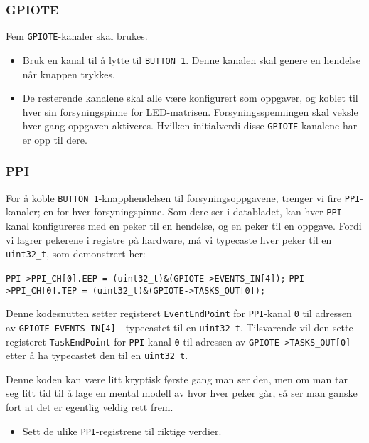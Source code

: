 \subsubsection{GPIOTE}

Fem \verb|GPIOTE|-kanaler skal brukes. 

\begin{itemize}
    \item Bruk en kanal til å lytte til \verb|BUTTON 1|. Denne kanalen skal genere en hendelse når knappen trykkes. 
    \item De resterende kanalene skal alle være konfigurert som oppgaver, og koblet til hver sin forsyningspinne for LED-matrisen. Forsyningsspenningen skal veksle hver gang oppgaven aktiveres. Hvilken initialverdi disse \verb|GPIOTE|-kanalene har er opp til dere.
\end{itemize}

\subsubsection{PPI}

For å koble \verb|BUTTON 1|-knapphendelsen til forsyningsoppgavene, trenger vi fire \verb|PPI|-kanaler; en for hver forsyningspinne. Som dere ser i databladet, kan hver \verb|PPI|-kanal konfigureres med en peker til en hendelse, og en peker til en oppgave. Fordi vi lagrer pekerene i registre på hardware, må vi typecaste hver peker til en \texttt{uint32\_t}, som demonstrert her:

\verb|PPI->PPI_CH[0].EEP = (uint32_t)&(GPIOTE->EVENTS_IN[4]);|\newline
\verb|PPI->PPI_CH[0].TEP = (uint32_t)&(GPIOTE->TASKS_OUT[0]);|


Denne kodesnutten setter registeret \verb|EventEndPoint| for \verb|PPI|-kanal \verb|0| til adressen av \verb|GPIOTE-EVENTS_IN[4]| - typecastet til en \verb|uint32_t|. Tilsvarende vil den sette registeret \verb|TaskEndPoint| for \verb|PPI|-kanal \verb|0| til adressen av \verb|GPIOTE->TASKS_OUT[0]| etter å ha typecastet den til en \verb|uint32_t|.


Denne koden kan være litt kryptisk første gang man ser den, men om man tar seg litt tid til å lage en mental modell av hvor hver peker går, så ser man ganske fort at det er egentlig veldig rett frem.

\begin{itemize}
    \item Sett de ulike \verb|PPI|-registrene til riktige verdier.
\end{itemize}


